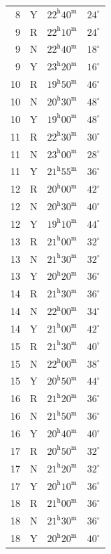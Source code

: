 \begin{longtable}{rllr}
8 & Y & $22^{\mathrm h}40^{\mathrm m}$ & $24^\circ$ \\
9 & R & $22^{\mathrm h}10^{\mathrm m}$ & $24^\circ$ \\
9 & N & $22^{\mathrm h}40^{\mathrm m}$ & $18^\circ$ \\
9 & Y & $23^{\mathrm h}20^{\mathrm m}$ & $16^\circ$ \\
10 & R & $19^{\mathrm h}50^{\mathrm m}$ & $46^\circ$ \\
10 & N & $20^{\mathrm h}30^{\mathrm m}$ & $48^\circ$ \\
10 & Y & $19^{\mathrm h}00^{\mathrm m}$ & $48^\circ$ \\
11 & R & $22^{\mathrm h}30^{\mathrm m}$ & $30^\circ$ \\
11 & N & $23^{\mathrm h}00^{\mathrm m}$ & $28^\circ$ \\
11 & Y & $21^{\mathrm h}55^{\mathrm m}$ & $36^\circ$ \\
12 & R & $20^{\mathrm h}00^{\mathrm m}$ & $42^\circ$ \\
12 & N & $20^{\mathrm h}30^{\mathrm m}$ & $40^\circ$ \\
12 & Y & $19^{\mathrm h}10^{\mathrm m}$ & $44^\circ$ \\
13 & R & $21^{\mathrm h}00^{\mathrm m}$ & $32^\circ$ \\
13 & N & $21^{\mathrm h}30^{\mathrm m}$ & $32^\circ$ \\
13 & Y & $20^{\mathrm h}20^{\mathrm m}$ & $36^\circ$ \\
14 & R & $21^{\mathrm h}30^{\mathrm m}$ & $36^\circ$ \\
14 & N & $22^{\mathrm h}00^{\mathrm m}$ & $34^\circ$ \\
14 & Y & $21^{\mathrm h}00^{\mathrm m}$ & $42^\circ$ \\
15 & R & $21^{\mathrm h}30^{\mathrm m}$ & $40^\circ$ \\
15 & N & $22^{\mathrm h}00^{\mathrm m}$ & $38^\circ$ \\
15 & Y & $20^{\mathrm h}50^{\mathrm m}$ & $44^\circ$ \\
16 & R & $21^{\mathrm h}20^{\mathrm m}$ & $36^\circ$ \\
16 & N & $21^{\mathrm h}50^{\mathrm m}$ & $36^\circ$ \\
16 & Y & $20^{\mathrm h}40^{\mathrm m}$ & $40^\circ$ \\
17 & R & $20^{\mathrm h}50^{\mathrm m}$ & $32^\circ$ \\
17 & N & $21^{\mathrm h}20^{\mathrm m}$ & $32^\circ$ \\
17 & Y & $20^{\mathrm h}10^{\mathrm m}$ & $36^\circ$ \\
18 & R & $21^{\mathrm h}00^{\mathrm m}$ & $36^\circ$ \\
18 & N & $21^{\mathrm h}30^{\mathrm m}$ & $36^\circ$ \\
18 & Y & $20^{\mathrm h}20^{\mathrm m}$ & $40^\circ$ \\
\end{longtable}
